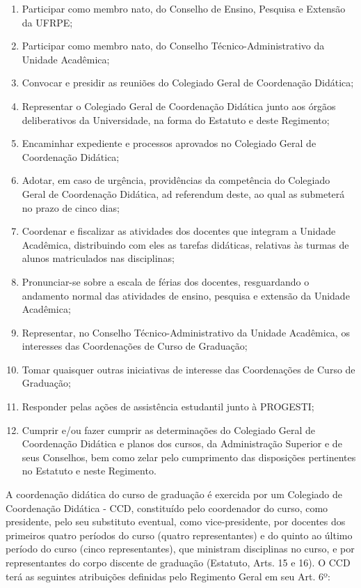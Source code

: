 \documentclass[
	12pt,				%
	openright,			%
  oneside,     %
	a4paper,			%
	chapter=TITLE,		%
	english,			%
	french,				%
	spanish,			%
	brazil				%
	]{abntex2}
\begin{document}
\begin{enumerate}
    \item Participar como membro nato, do Conselho de Ensino, Pesquisa e Extensão da UFRPE;
    \item Participar como membro nato, do Conselho Técnico-Administrativo da Unidade 	Acadêmica;
    \item Convocar e presidir as reuniões do Colegiado Geral de Coordenação Didática;
    \item Representar o Colegiado Geral de Coordenação Didática junto aos órgãos 	deliberativos da Universidade, na forma do Estatuto e deste Regimento;
    \item Encaminhar expediente e processos aprovados no Colegiado Geral de Coordenação Didática;
    \item Adotar, em caso de urgência, providências da competência do Colegiado Geral de Coordenação Didática, ad referendum deste, ao qual as submeterá no prazo de cinco dias;
    \item Coordenar e fiscalizar as atividades dos docentes que integram a Unidade Acadêmica, distribuindo com eles as tarefas didáticas, relativas 	às turmas de alunos matriculados nas disciplinas;
    \item Pronunciar-se 	sobre a escala de férias dos docentes, resguardando o andamento normal das atividades de ensino, pesquisa e extensão da Unidade Acadêmica;
    \item Representar, no Conselho Técnico-Administrativo da Unidade Acadêmica, os  interesses das Coordenações de Curso de Graduação;
    \item Tomar quaisquer outras iniciativas de interesse das Coordenações de Curso de Graduação;
    \item Responder pelas ações de assistência estudantil junto à PROGESTI;
    \item Cumprir e/ou fazer cumprir as determinações do Colegiado Geral de Coordenação Didática e planos dos cursos, da Administração Superior e de seus Conselhos, bem como zelar pelo cumprimento das disposições pertinentes no Estatuto e neste Regimento.
\end{enumerate}

A coordenação didática do curso de graduação é exercida por um Colegiado de Coordenação Didática - CCD, constituído pelo coordenador do curso, como presidente, pelo seu substituto eventual, como vice-presidente, por docentes dos primeiros quatro períodos do curso (quatro representantes) e do quinto ao último período do curso (cinco representantes), que ministram disciplinas no curso, e por representantes do corpo discente de graduação (Estatuto, Arts. 15 e 16). O CCD terá as seguintes atribuições definidas pelo Regimento Geral em seu Art. 6º:
\end{document}

